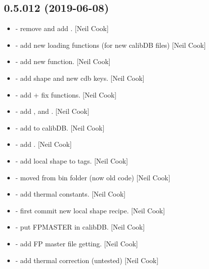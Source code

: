 \documentclass[a4paper,10pt,english]{report}
\begin{document}
\subsection{0.5.012 (2019-06-08)}
\label{\detokenize{misc/changelog:id125}}\begin{itemize}
\item {} 
 - remove  and add
. {[}Neil Cook{]}

\item {} 
 - add new loading functions (for new calibDB files)
{[}Neil Cook{]}

\item {} 
 - add new  function. {[}Neil
Cook{]}

\item {} 
 - add shape and new cdb keys. {[}Neil Cook{]}

\item {} 
 - add  + fix  functions.
{[}Neil Cook{]}

\item {} 
 - add ,  and
. {[}Neil Cook{]}

\item {} 
 - add  to calibDB. {[}Neil Cook{]}

\item {} 
 - add . {[}Neil Cook{]}

\item {} 
 - add local shape to tags. {[}Neil Cook{]}

\item {} 
 - moved from bin folder (now old code) {[}Neil Cook{]}

\item {} 
 - add thermal constants. {[}Neil Cook{]}

\item {} 
 - first commit new local shape recipe. {[}Neil Cook{]}

\item {} 
 - put FPMASTER in calibDB. {[}Neil Cook{]}

\item {} 
 - add FP master file getting. {[}Neil Cook{]}

\item {} 
 - add thermal correction (untested) {[}Neil
Cook{]}

\end{itemize}
\end{document}
